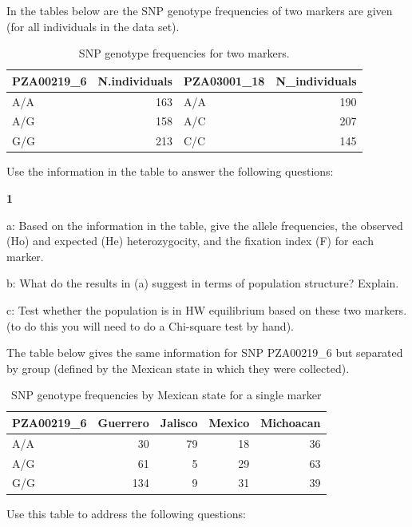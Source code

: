 \documentclass[
]{book}
\makeatletter
\newenvironment{kframe}{%
\medskip{}
\setlength{\fboxsep}{.8em}
 \def\at@end@of@kframe{}%
 \ifinner\ifhmode%
  \def\at@end@of@kframe{\end{minipage}}%
  \begin{minipage}{\columnwidth}%
 \fi\fi%
 \def\FrameCommand##1{\hskip\@totalleftmargin \hskip-\fboxsep
 \colorbox{shadecolor}{##1}\hskip-\fboxsep
     \hskip-\linewidth \hskip-\@totalleftmargin \hskip\columnwidth}%
 \MakeFramed {\advance\hsize-\width
   \@totalleftmargin\z@ \linewidth\hsize
   \@setminipage}}%
 {\par\unskip\endMakeFramed%
 \at@end@of@kframe}
\newenvironment{rmdblock}[1]
  {
  \begin{itemize}
  \renewcommand{\labelitemi}{
    \raisebox{-.7\height}[0pt][0pt]{
      {\setkeys{Gin}{width=3em,keepaspectratio}\texttt{[image: images/\#1]}}
    }
  }
  \setlength{\fboxsep}{1em}
  \begin{kframe}
  \item
  }
  {
  \end{kframe}
  \end{itemize}
  }
\newenvironment{rmdquiz}
  {\begin{rmdblock}{quiz}}
  {\end{rmdblock}}
\makeatother
\begin{document}
In the tables below are the SNP genotype frequencies of two markers are given (for all individuals in the data set).

\begin{table}

\caption{\label{tab:unnamed-chunk-258}SNP genotype frequencies for two markers.}
\centering
\begin{tabular}[t]{lrlr}
\toprule
PZA00219\_6 & N.individuals & PZA03001\_18 & N\_individuals\\
\midrule
A/A & 163 & A/A & 190\\
A/G & 158 & A/C & 207\\
G/G & 213 & C/C & 145\\
\bottomrule
\end{tabular}
\end{table}

Use the information in the table to answer the following questions:

\begin{rmdquiz}
\textbf{1}

a: Based on the information in the table, give the allele frequencies, the observed (Ho) and expected (He) heterozygocity, and the fixation index (F) for each marker.

b: What do the results in (a) suggest in terms of population structure? Explain.

c: Test whether the population is in HW equilibrium based on these two markers. (to do this you will need to do a Chi-square test by hand).
\end{rmdquiz}

The table below gives the same information for SNP PZA00219\_6 but separated by group (defined by the Mexican state in which they were collected).

\begin{table}

\caption{\label{tab:unnamed-chunk-260}SNP genotype frequencies by Mexican state for a single marker}
\centering
\begin{tabular}[t]{lrrrr}
\toprule
PZA00219\_6 & Guerrero & Jalisco & Mexico & Michoacan\\
\midrule
A/A & 30 & 79 & 18 & 36\\
A/G & 61 & 5 & 29 & 63\\
G/G & 134 & 9 & 31 & 39\\
\bottomrule
\end{tabular}
\end{table}

Use this table to address the following questions:
\end{document}
